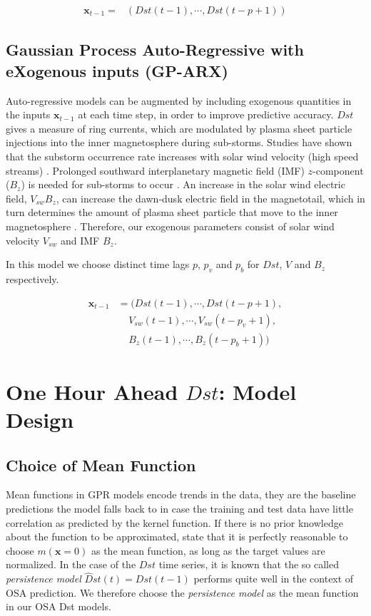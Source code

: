 \documentclass{article}
\begin{document}
\begin{align*}
    \mathbf{x}_{t-1} = & \left(Dst(t-1), \cdots , Dst(t-p+1)\right)
\end{align*}

\subsection{Gaussian Process Auto-Regressive with eXogenous inputs (GP-ARX)} \label{sec:gparx}

Auto-regressive models can be augmented by including exogenous quantities in the inputs $\mathbf{x}_{t-1}$ at each time step, in order to improve predictive accuracy. $Dst$ gives a measure of ring currents, which are modulated by plasma sheet particle injections into the inner magnetosphere during sub-storms. Studies have shown that the substorm occurrence rate increases with solar wind velocity (high speed streams) \citet{Kissinger2011,Newell2016}. Prolonged southward interplanetary magnetic field (IMF) $z$-component ($B_z$) is needed for sub-storms to occur \citet{McPherron1986}. An increase in the solar wind electric field, $V_{sw}B_z$, can increase the dawn-dusk electric field in the magnetotail, which in turn determines the amount of plasma sheet particle that move to the inner magnetosphere \citet{Friedel2001}. Therefore, our exogenous parameters consist of solar wind velocity $V_{sw}$ and IMF $B_z$.   

In this model we choose distinct time lags $p$, $p_{v}$ and $p_{b}$ for $Dst$, $V$ and $B_z$ respectively.
    
\begin{align*}
       \mathbf{x}_{t-1} & = (Dst(t-1), \cdots , Dst(t-p+1), \\
        & \ \ \ \ \  V_{sw}(t-1), \cdots, V_{sw}(t-p_{v}+1),\\
        & \ \ \ \ \  B_{z}(t-1), \cdots, B_{z}(t-p_{b}+1))
\end{align*}

\section{One Hour Ahead $Dst$: Model Design}\label{sec:modeldesign}

\subsection{Choice of Mean Function}

Mean functions in GPR models encode trends in the data, they are the baseline predictions the model falls back to in case the training and test data have little correlation as predicted by the kernel function. If there is no prior knowledge about the function to be approximated, \citet{Rasmussen:2005:GPM:1162254} state that it is perfectly reasonable to choose $m(\mathbf{x} = 0)$ as the mean function, as long as the target values are normalized. In the case of the $Dst$ time series, it is known that the so called \emph{persistence model} $\hat{D}st(t) = Dst(t-1)$ performs quite well in the context of OSA prediction. We therefore choose the \emph{persistence model} as the mean function in our OSA Dst models.
\end{document}
